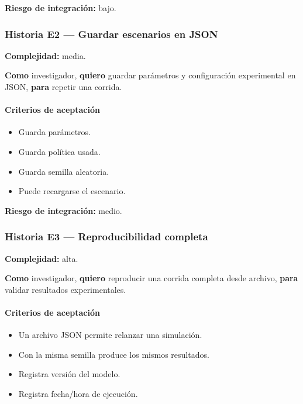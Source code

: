 \documentclass[11pt,a4paper]{article}
\begin{document}
\textbf{Riesgo de integraci\'on:} bajo.

\subsubsection{Historia E2 --- Guardar escenarios en JSON}

\textbf{Complejidad:} media.

\textbf{Como} investigador, \textbf{quiero} guardar par\'ametros y configuraci\'on experimental en JSON, \textbf{para} repetir una corrida.

\paragraph{Criterios de aceptaci\'on}

\begin{itemize}[leftmargin=*]
    \item Guarda par\'ametros.
    \item Guarda pol\'itica usada.
    \item Guarda semilla aleatoria.
    \item Puede recargarse el escenario.
\end{itemize}

\textbf{Riesgo de integraci\'on:} medio.

\subsubsection{Historia E3 --- Reproducibilidad completa}

\textbf{Complejidad:} alta.

\textbf{Como} investigador, \textbf{quiero} reproducir una corrida completa desde archivo, \textbf{para} validar resultados experimentales.

\paragraph{Criterios de aceptaci\'on}

\begin{itemize}[leftmargin=*]
    \item Un archivo JSON permite relanzar una simulaci\'on.
    \item Con la misma semilla produce los mismos resultados.
    \item Registra versi\'on del modelo.
    \item Registra fecha/hora de ejecuci\'on.
\end{itemize}
\end{document}
